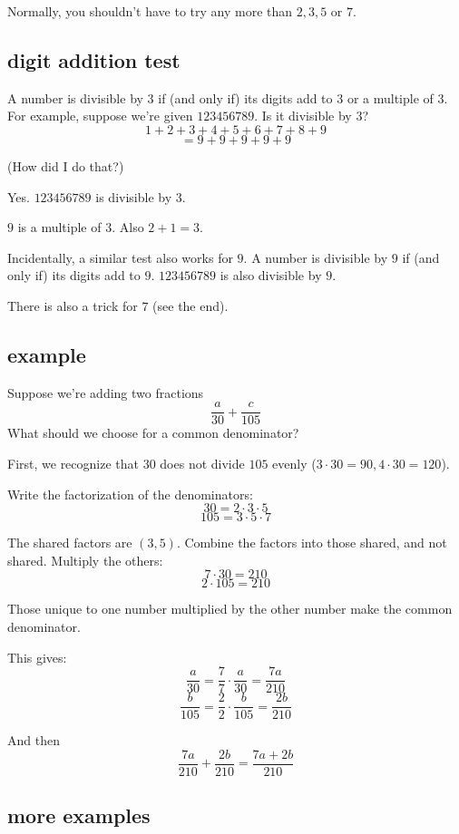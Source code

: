 \documentclass[11pt, oneside]{article}
\begin{document}
Normally, you shouldn't have to try any more than $2,3,5$ or $7$.

\subsection*{digit addition test}

A number is divisible by $3$ if (and only if) its digits add to $3$ or a multiple of $3$.  For example, suppose we're given $123456789$.  Is it divisible by $3$?
\[ 1 + 2 + 3 + 4 + 5 + 6 + 7 + 8 + 9 \]
\[ = 9 + 9 + 9 + 9 + 9  \]

(How did I do that?)

Yes.  $123456789$ is divisible by $3$.

$9$ is a multiple of $3$.  Also $2 + 1 = 3$.

Incidentally, a similar test also works for $9$.  A number is divisible by $9$ if (and only if) its digits add to $9$.  $123456789$ is also divisible by $9$.

There is also a trick for $7$ (see the end).

\subsection*{example}

Suppose we're adding two fractions
\[ \frac{a}{30} + \frac{c}{105}  \]
What should we choose for a common denominator?  

First, we recognize that $30$ does not divide $105$ evenly ($3 \cdot 30 = 90, 4 \cdot 30 = 120$).

Write the factorization of the denominators:
\[ 30 = 2 \cdot 3 \cdot 5 \]
\[ 105 = 3 \cdot 5 \cdot 7 \]

The shared factors are $(3,5)$.  Combine the factors into those shared, and not shared.  Multiply the others:
\[ 7 \cdot 30 = 210 \]
\[ 2 \cdot 105 = 210 \]

Those unique to one number multiplied by the other number make the common denominator.

This gives:
\[ \frac{a}{30} = \frac{7}{7} \cdot \frac{a}{30} = \frac{7a}{210} \]
\[ \frac{b}{105} = \frac{2}{2} \cdot \frac{b}{105} = \frac{2b}{210} \]

And then
\[ \frac{7a}{210} + \frac{2b}{210} = \frac{7a + 2b}{210} \]

\subsection*{more examples}
\end{document}
